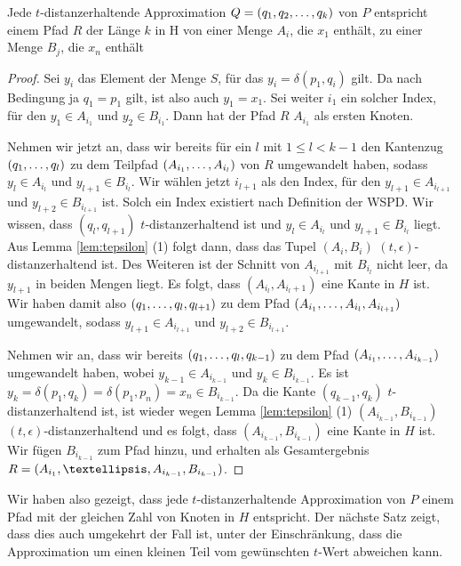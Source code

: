 	\begin{theorem}
		\label{theo:Approx2H}
		Jede $t$-distanzerhaltende Approximation $Q = (q_1, q_2, \mathellipsis, q_k)$ von $P$ entspricht einem Pfad $R$ der Länge $k$ in H von einer Menge $A_i$, die $x_1$ enthält, zu einer Menge $B_j$, die $x_n$ enthält
	\end{theorem}
	\begin{proof}
		Sei $y_i$ das Element der Menge $S$, für das $y_i = \delta(p_1, q_i)$ gilt. Da nach Bedingung ja $q_1 = p_1$ gilt, ist also auch $y_1 = x_1$.
		Sei weiter $i_1$ ein solcher Index, für den $y_1 \in A_{i_1}$ und $y_2 \in B_{i_1}$. Dann hat der Pfad $R$ $A_{i_1}$ als ersten Knoten.
		
		Nehmen wir jetzt an, dass wir bereits für ein $l$ mit $1 \leq l < k-1$ den Kantenzug $(q_1, \mathellipsis, q_l)$ zu dem Teilpfad $(A_{i_1}, \mathellipsis, A_{i_l})$ von $R$ umgewandelt haben, sodass $y_l \in A_{i_l}$ und $y_{l+1} \in B_{i_l}$. Wir wählen jetzt $i_{l+1}$ als den Index, für den $y_{l+1} \in A_{i_{l+1}}$ und $y_{l+2} \in B_{i_{l+1}}$ ist. Solch ein Index existiert nach Definition der WSPD. Wir wissen, dass $(q_l, q_{l+1})$ $t$-distanzerhaltend ist und $y_l \in A_{i_l}$ und $y_{l+1} \in B_{i_l} $ liegt. Aus Lemma \ref{lem:tepsilon} (1) folgt dann, dass das Tupel $(A_i, B_i)$ $(t, \epsilon)$-distanzerhaltend ist. Des Weiteren ist der Schnitt von $A_{i_{l+1}}$ mit $B_{i_l}$ nicht leer, da $y_{l+1}$ in beiden Mengen liegt. Es folgt, dass $(A_{i_l}, A_{i_l+1})$ eine Kante in $H$ ist. Wir haben damit also $(q_1, \mathellipsis, q_l, q_{l+1})$ zu dem Pfad $(A_{i_1}, \mathellipsis, A_{i_l}, A_{i_{l+1}})$ umgewandelt, sodass $y_{l+1} \in A_{i_{l+1}}$ und $y_{l+2} \in B_{i_{l+1}}$.
		
		Nehmen wir an, dass wir bereits $(q_1, \mathellipsis, q_l, q_{k-1})$ zu dem Pfad $(A_{i_1}, \mathellipsis, A_{i_{k-1}})$ umgewandelt haben, wobei $y_{k-1} \in A_{i_{k-1}}$ und $y_k \in B_{i_{k-1}}$. Es ist $y_k = \delta(p_1, q_k) = \delta(p_1, p_n) = x_n \in B_{i_{k-1}}$. Da die Kante $(q_{k-1}, q_k)$ $t$-distanzerhaltend ist, ist wieder wegen Lemma \ref{lem:tepsilon} (1) $(A_{i_{k-1}}, B_{i_{k-1}})$ $(t, \epsilon)$-distanzerhaltend und es folgt, dass $(A_{i_{k-1}}, B_{i_{k-1}})$ eine Kante in $H$ ist. Wir fügen $B_{i_{k-1}}$ zum Pfad hinzu, und erhalten als Gesamtergebnis $R = (A_{i_1}, \textellipsis, A_{i_{k-1}}, B_{i_{k-1}})$.
	\end{proof}
	
	Wir haben also gezeigt, dass jede $t$-distanzerhaltende Approximation von $P$ einem Pfad mit der gleichen Zahl von Knoten in $H$ entspricht. Der nächste Satz zeigt, dass dies auch umgekehrt der Fall ist, unter der Einschränkung, dass die Approximation um einen kleinen Teil vom gewünschten $t$-Wert abweichen kann.
	
